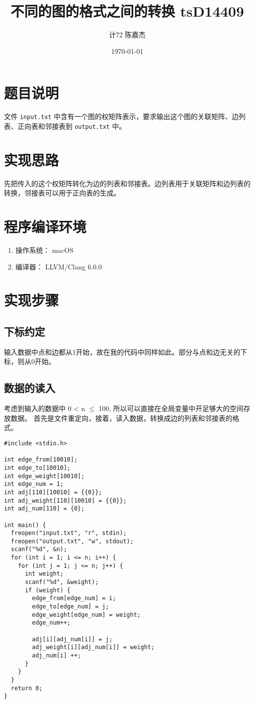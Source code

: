 \documentclass[11pt]{article}
\author{计72 陈嘉杰}
\date{\today}
\title{不同的图的格式之间的转换 tsD14409}
\begin{document}
\maketitle
\tableofcontents

\section{题目说明}
\label{sec:org3b7d151}
文件 \texttt{input.txt} 中含有一个图的权矩阵表示，要求输出这个图的关联矩阵、边列表、正向表和邻接表到 \texttt{output.txt} 中。

\section{实现思路}
\label{sec:org085569d}
先把传入的这个权矩阵转化为边的列表和邻接表。边列表用于关联矩阵和边列表的转换，邻接表可以用于正向表的生成。

\section{程序编译环境}
\label{sec:org20e1ea2}
\begin{enumerate}
\item 操作系统： macOS
\item 编译器： LLVM/Clang 6.0.0
\end{enumerate}

\section{实现步骤}
\label{sec:org718464f}
\subsection{下标约定}
\label{sec:org502cf27}
输入数据中点和边都从1开始，故在我的代码中同样如此。部分与点和边无关的下标，则从0开始。
\subsection{数据的读入}
\label{sec:orga1504ac}

考虑到输入的数据中 0 < n \(\le\) 100, 所以可以直接在全局变量中开足够大的空间存放数据。
首先是文件重定向，接着，读入数据，转换成边的列表和邻接表的格式。

\begin{verbatim}
#include <stdio.h>

int edge_from[10010];
int edge_to[10010];
int edge_weight[10010];
int edge_num = 1;
int adj[110][10010] = {{0}};
int adj_weight[110][10010] = {{0}};
int adj_num[110] = {0};

int main() {
  freopen("input.txt", "r", stdin);
  freopen("output.txt", "w", stdout);
  scanf("%d", &n);
  for (int i = 1; i <= n; i++) {
    for (int j = 1; j <= n; j++) {
      int weight;
      scanf("%d", &weight);
      if (weight) {
        edge_from[edge_num] = i;
        edge_to[edge_num] = j;
        edge_weight[edge_num] = weight;
        edge_num++;

        adj[i][adj_num[i]] = j;
        adj_weight[i][adj_num[i]] = weight;
        adj_num[i] ++;
      }
    }
  }
  return 0;
}
\end{verbatim}
\end{document}
